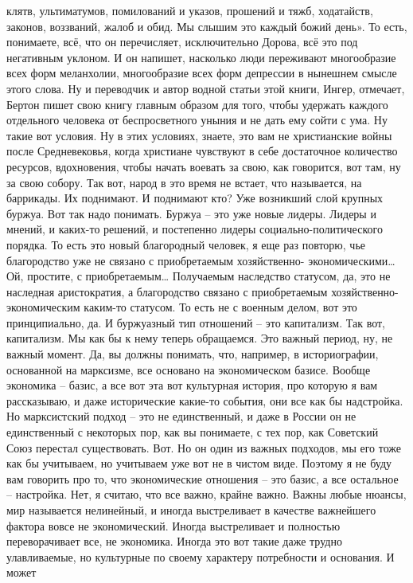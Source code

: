 клятв, ультиматумов, помилований и указов, прошений и тяжб, ходатайств, законов,
воззваний, жалоб и обид. Мы слышим это каждый божий день». То есть, понимаете,
всё, что он перечисляет, исключительно Дорова, всё это под негативным уклоном. И
он напишет, насколько люди переживают многообразие всех форм меланхолии,
многообразие всех форм депрессии в нынешнем смысле этого слова. Ну и переводчик
и автор водной статьи этой книги, Ингер, отмечает, Бертон пишет свою книгу
главным образом для того, чтобы удержать каждого отдельного человека от
беспросветного уныния и не дать ему сойти с ума. Ну такие вот условия. Ну в этих
условиях, знаете, это вам не христианские войны после Средневековья, когда
христиане чувствуют в себе достаточное количество ресурсов, вдохновения, чтобы
начать воевать за свою, как говорится, вот там, ну за свою собору. Так вот,
народ в это время не встает, что называется, на баррикады. Их поднимают. И
поднимают кто? Уже возникший слой крупных буржуа. Вот так надо понимать. Буржуа
– это уже новые лидеры. Лидеры и мнений, и каких-то решений, и постепенно лидеры
социально-политического порядка. То есть это новый благородный человек, я еще
раз повторю, чье благородство уже не связано с приобретаемым хозяйственно-
экономическими… Ой, простите, с приобретаемым… Получаемым наследство статусом,
да, это не наследная аристократия, а благородство связано с приобретаемым
хозяйственно-экономическим каким-то статусом. То есть не с военным делом, вот
это принципиально, да. И буржуазный тип отношений – это капитализм. Так вот,
капитализм. Мы как бы к нему теперь обращаемся. Это важный период, ну, не важный
момент. Да, вы должны понимать, что, например, в историографии, основанной на
марксизме, все основано на экономическом базисе. Вообще экономика – базис, а все
вот эта вот культурная история, про которую я вам рассказываю, и даже
исторические какие-то события, они все как бы надстройка. Но марксистский подход
– это не единственный, и даже в России он не единственный с некоторых пор, как
вы понимаете, с тех пор, как Советский Союз перестал существовать. Вот. Но он
один из важных подходов, мы его тоже как бы учитываем, но учитываем уже вот не в
чистом виде. Поэтому я не буду вам говорить про то, что экономические отношения
– это базис, а все остальное – настройка. Нет, я считаю, что все важно, крайне
важно. Важны любые нюансы, мир называется нелинейный, и иногда выстреливает в
качестве важнейшего фактора вовсе не экономический. Иногда выстреливает и
полностью переворачивает все, не экономика. Иногда это вот такие даже трудно
улавливаемые, но культурные по своему характеру потребности и основания. И может
